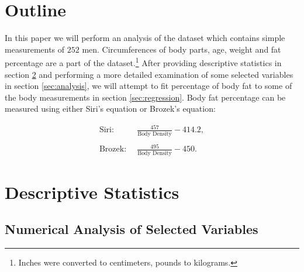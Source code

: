 \documentclass[11pt,american,american]{article}
\begin{document}
\begin{titlepage}
	
%	
	
	\vfill %
	
\end{titlepage}


\section{Outline}\label{sec:outline}

In this paper we will perform an analysis of the dataset which contains simple measurements of $252$ men. Circumferences of body parts, age, weight and fat percentage are a part of the dataset.\footnote{Inches were converted to centimeters, pounds to kilograms.} After providing descriptive statistics in section \ref{sec:desc} and performing a more detailed examination of some selected variables in section \ref{sec:analysis}, we will attempt to fit percentage of body fat to some of the body measurements in section \ref{sec:regression}. Body fat percentage can be measured using either Siri's equation or Brozek's equation:

\begin{equation*}
	\begin{split}
		\text{Siri: } \, &\frac{457}{\text{Body Density}} - 414.2,	\\ \\
		\text{Brozek: } \, &\frac{495}{\text{Body Density}} - 450.
	\end{split}
\end{equation*}

\section{Descriptive Statistics}\label{sec:desc}

\subsection{Numerical Analysis of Selected Variables}
\end{document}
